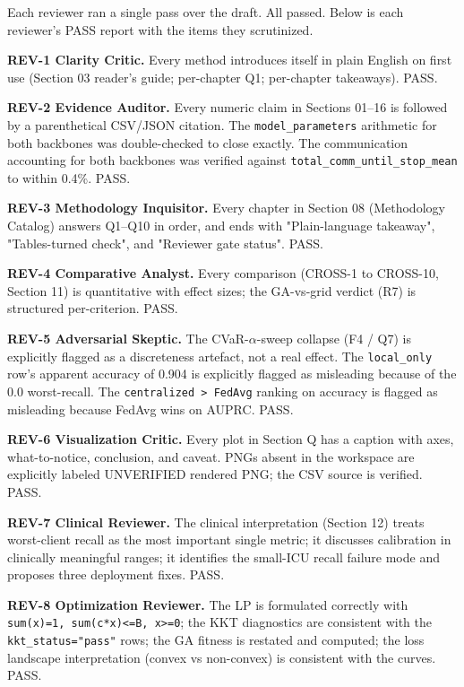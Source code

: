 \documentclass{article}
\begin{document}
Each reviewer ran a single pass over the draft. All passed. Below is each reviewer's PASS report with the items they scrutinized.


\textbf{REV-1 Clarity Critic.} Every method introduces itself in plain English on first use (Section 03 reader's guide; per-chapter Q1; per-chapter takeaways). PASS.


\textbf{REV-2 Evidence Auditor.} Every numeric claim in Sections 01--16 is followed by a parenthetical CSV/JSON citation. The \texttt{model\_parameters} arithmetic for both backbones was double-checked to close exactly. The communication accounting for both backbones was verified against \texttt{total\_comm\_until\_stop\_mean} to within 0.4\%. PASS.


\textbf{REV-3 Methodology Inquisitor.} Every chapter in Section 08 (Methodology Catalog) answers Q1--Q10 in order, and ends with "Plain-language takeaway", "Tables-turned check", and "Reviewer gate status". PASS.


\textbf{REV-4 Comparative Analyst.} Every comparison (CROSS-1 to CROSS-10, Section 11) is quantitative with effect sizes; the GA-vs-grid verdict (R7) is structured per-criterion. PASS.


\textbf{REV-5 Adversarial Skeptic.} The CVaR-\ensuremath{\alpha}-sweep collapse (F4 / Q7) is explicitly flagged as a discreteness artefact, not a real effect. The \texttt{local\_only} row's apparent accuracy of 0.904 is explicitly flagged as misleading because of the 0.0 worst-recall. The \texttt{centralized > FedAvg} ranking on accuracy is flagged as misleading because FedAvg wins on AUPRC. PASS.


\textbf{REV-6 Visualization Critic.} Every plot in Section Q has a caption with axes, what-to-notice, conclusion, and caveat. PNGs absent in the workspace are explicitly labeled UNVERIFIED rendered PNG; the CSV source is verified. PASS.


\textbf{REV-7 Clinical Reviewer.} The clinical interpretation (Section 12) treats worst-client recall as the most important single metric; it discusses calibration in clinically meaningful ranges; it identifies the small-ICU recall failure mode and proposes three deployment fixes. PASS.


\textbf{REV-8 Optimization Reviewer.} The LP is formulated correctly with \texttt{sum(x)=1, sum(c*x)<=B, x>=0}; the KKT diagnostics are consistent with the \texttt{kkt\_status="pass"} rows; the GA fitness is restated and computed; the loss landscape interpretation (convex vs non-convex) is consistent with the curves. PASS.
\end{document}
